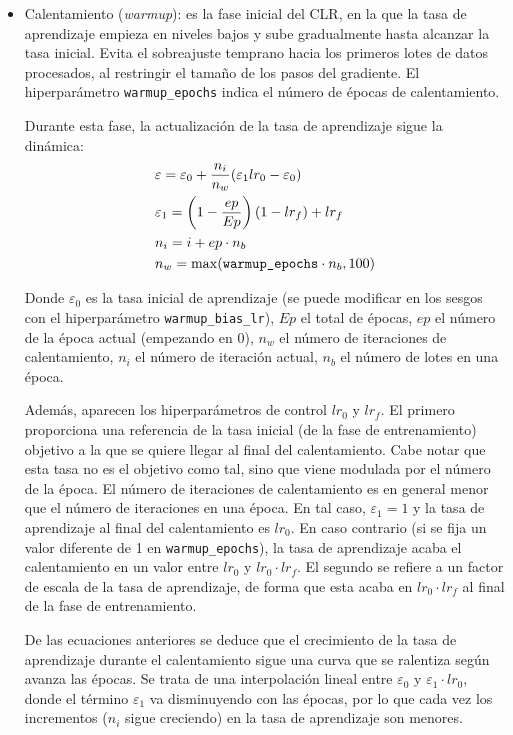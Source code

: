 \documentclass{article}
\begin{document}
	\begin{itemize}
		\item Calentamiento (\textit{warmup}): es la fase inicial del CLR, en la que la tasa de aprendizaje empieza en niveles bajos y sube gradualmente hasta alcanzar la tasa inicial. Evita el sobreajuste temprano hacia los primeros lotes de datos procesados, al restringir el tamaño de los pasos del gradiente. El hiperparámetro \texttt{warmup\_epochs} indica el número de épocas de calentamiento.
		
		Durante esta fase, la actualización de la tasa de aprendizaje sigue la dinámica:
		\newpage
		\begin{align}
			& \varepsilon = \varepsilon_0 + \frac{n_i}{n_w} (\varepsilon_1 lr_0 - \varepsilon_0) \\
			& \varepsilon_1 = \left(1 - \frac{ep}{Ep}\right)(1 - lr_f) + lr_f \\
			& n_i = i + ep \cdot n_b \\
			& n_w = \max(\text{\texttt{warmup\_epochs}} \cdot n_b, 100)
		\end{align}
		
		Donde $\varepsilon_0$ es la tasa inicial de aprendizaje (se puede modificar en los sesgos con el hiperparámetro \texttt{warmup\_bias\_lr}), $Ep$ el total de épocas, $ep$ el número de la época actual (empezando en 0), $n_w$ el número de iteraciones de calentamiento, $n_i$ el número de iteración actual, $n_b$ el número de lotes en una época. 
		
		Además, aparecen los hiperparámetros de control $lr_0$ y $lr_f$. El primero proporciona una referencia de la tasa inicial (de la fase de entrenamiento) objetivo a la que se quiere llegar al final del calentamiento. Cabe notar que esta tasa no es el objetivo como tal, sino que viene modulada por el número de la época. El número de iteraciones de calentamiento es en general menor que el número de iteraciones en una época. En tal caso, $\varepsilon_1 = 1$ y la tasa de aprendizaje al final del calentamiento es $lr_0$. En caso contrario (si se fija un valor diferente de 1 en \texttt{warmup\_epochs}), la tasa de aprendizaje acaba el calentamiento en un valor entre $lr_0$ y $lr_0\cdot lr_f$. El segundo se refiere a un factor de escala de la tasa de aprendizaje, de forma que esta acaba en $lr_0 \cdot lr_f$ al final de la fase de entrenamiento.
		
		De las ecuaciones anteriores se deduce que el crecimiento de la tasa de aprendizaje durante el calentamiento sigue una curva que se ralentiza según avanza las épocas. Se trata de una interpolación lineal entre $\varepsilon_0$ y $\varepsilon_1\cdot lr_0$, donde el término $\varepsilon_1$ va disminuyendo con las épocas, por lo que cada vez los incrementos ($n_i$ sigue creciendo) en la tasa de aprendizaje son menores.
		

\end{itemize}
\end{document}
